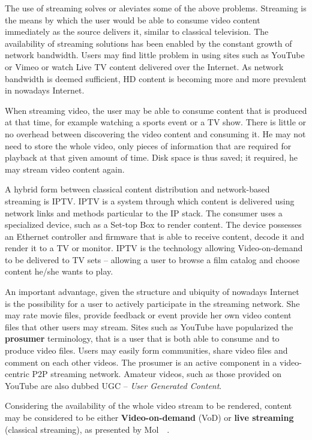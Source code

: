 The use of streaming solves or aleviates some of the above problems. Streaming
is the means by which the user would be able to consume video content
immediately as the source delivers it, similar to classical television. The
availability of streaming solutions has been enabled by the constant growth of
network bandwidth. Users may find little problem in using sites such as
YouTube or Vimeo or watch Live TV content delivered over the Internet. As
network bandwidth is deemed sufficient, HD content is becoming more and more
prevalent in nowadays Internet.

When streaming video, the user may be able to consume content that is produced
at that time, for example watching a sports event or a TV show. There is
little or no overhead between discovering the video content and consuming it.
He may not need to store the whole video, only pieces of information that are
required for playback at that given amount of time. Disk space is thus saved;
it required, he may stream video content again.

A hybrid form between classical content distribution and network-based
streaming is IPTV. IPTV is a system through which content is delivered using
network links and methods particular to the IP stack. The consumer uses a
specialized device, such as a Set-top Box to render content. The device
possesses an Ethernet controller and firmware that is able to receive content,
decode it and render it to a TV or monitor. IPTV is the technology allowing
Video-on-demand to be delivered to TV sets -- allowing a user to browse a film
catalog and choose content he/she wants to play.

An important advantage, given the structure and ubiquity of nowadays Internet
is the possibility for a user to actively participate in the streaming
network. She may rate movie files, provide feedback or event provide her own
video content files that other users may stream. Sites such as YouTube have
popularized the \textbf{prosumer} terminology, that is a user that is both
able to consume and to produce video files. Users may easily form communities,
share video files and comment on each other videos. The prosumer is an active
component in a video-centric P2P streaming network. Amateur videos, such as
those provided on YouTube are also dubbed UGC -- \textit{User Generated
Content}.

Considering the availability of the whole video stream to be rendered, content
may be considered to be either \textbf{Video-on-demand} (VoD) or \textbf{live
streaming} (classical streaming), as presented by
Mol~\cite{give-to-get}~\cite{design-p2p-live}.

